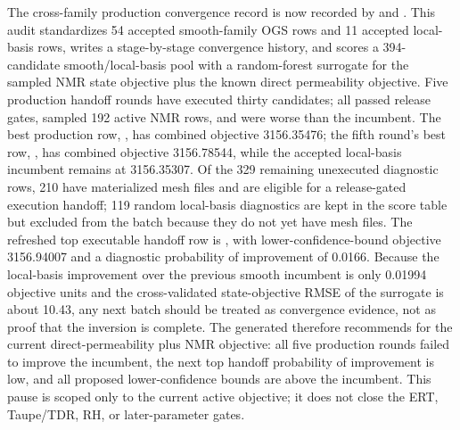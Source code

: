The cross-family production convergence record is now recorded by
 and
.  This
audit standardizes 54 accepted smooth-family OGS rows and 11 accepted
local-basis rows, writes a stage-by-stage convergence history, and scores a
394-candidate smooth/local-basis pool with a random-forest surrogate for the sampled
NMR state objective plus the known direct permeability objective.  Five production
handoff rounds have executed thirty candidates; all passed release gates, sampled
192 active NMR rows, and were worse than the incumbent.  The best production row,
, has combined objective 3156.35476; the fifth
round's best row, , has combined objective
3156.78544, while the accepted local-basis incumbent remains
 at 3156.35307.  Of the 329 remaining
unexecuted diagnostic rows, 210 have materialized mesh files and are eligible for a
release-gated execution handoff; 119 random local-basis diagnostics are kept in the
score table but excluded from the batch because they do not yet have mesh files.  The
refreshed top executable handoff row is , with
lower-confidence-bound objective 3156.94007 and a diagnostic probability of
improvement of 0.0166.  Because the local-basis improvement over the previous smooth
incumbent is only 0.01994 objective units and the cross-validated state-objective RMSE
of the surrogate is about 10.43, any next batch should be treated as convergence
evidence, not as proof that the inversion is complete.  The generated
 therefore recommends
 for the current direct-permeability plus NMR
objective: all five production rounds failed to improve the incumbent, the next top
handoff probability of improvement is low, and all proposed lower-confidence bounds
are above the incumbent.  This pause is scoped only to the current active objective;
it does not close the ERT, Taupe/TDR, RH, or later-parameter gates.

